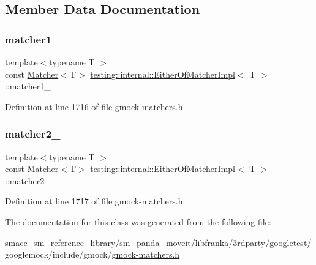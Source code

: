 \subsection{Member Data Documentation}
\mbox{\label{classtesting_1_1internal_1_1EitherOfMatcherImpl_ae4ac9a56093a18b90168cc6f8a3be9d3}} 
\subsubsection{\texorpdfstring{matcher1\+\_\+}{matcher1\_}}
{\footnotesize\ttfamily template$<$typename T $>$ \\
const \hyperlink{classtesting_1_1Matcher}{Matcher}$<$T$>$ \hyperlink{classtesting_1_1internal_1_1EitherOfMatcherImpl}{testing\+::internal\+::\+Either\+Of\+Matcher\+Impl}$<$ T $>$\+::matcher1\+\_\+\hspace{0.3cm}{\ttfamily [private]}}



Definition at line 1716 of file gmock-\/matchers.\+h.

\mbox{\label{classtesting_1_1internal_1_1EitherOfMatcherImpl_a73b3d0e53d7bca7ffb324d3a904eb62f}} 
\subsubsection{\texorpdfstring{matcher2\+\_\+}{matcher2\_}}
{\footnotesize\ttfamily template$<$typename T $>$ \\
const \hyperlink{classtesting_1_1Matcher}{Matcher}$<$T$>$ \hyperlink{classtesting_1_1internal_1_1EitherOfMatcherImpl}{testing\+::internal\+::\+Either\+Of\+Matcher\+Impl}$<$ T $>$\+::matcher2\+\_\+\hspace{0.3cm}{\ttfamily [private]}}



Definition at line 1717 of file gmock-\/matchers.\+h.



The documentation for this class was generated from the following file\+:\begin{DoxyCompactItemize}
\item 
smacc\+\_\+sm\+\_\+reference\+\_\+library/sm\+\_\+panda\+\_\+moveit/libfranka/3rdparty/googletest/googlemock/include/gmock/\hyperlink{gmock-matchers_8h}{gmock-\/matchers.\+h}\end{DoxyCompactItemize}
